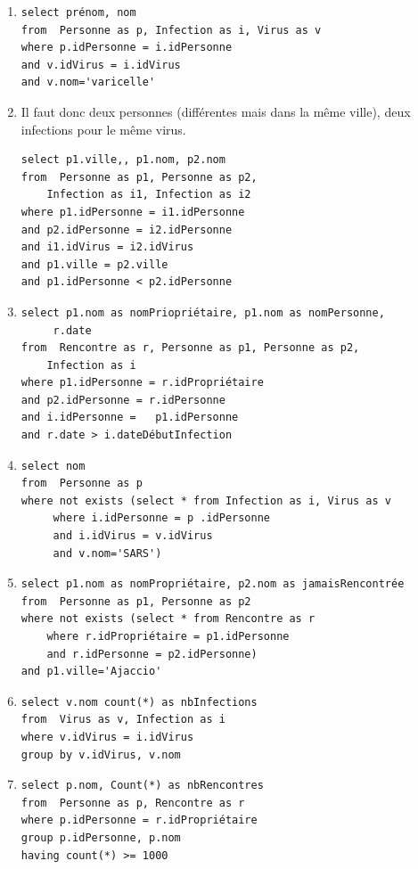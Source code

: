 \begin{solution}


\begin{enumerate}
  \item 
\begin{verbatim}
select prénom, nom
from  Personne as p, Infection as i, Virus as v
where p.idPersonne = i.idPersonne
and v.idVirus = i.idVirus
and v.nom='varicelle'
\end{verbatim}

 \item Il faut donc deux personnes (différentes mais
    dans la même ville),  deux infections pour le même virus.
\begin{verbatim}
select p1.ville,, p1.nom, p2.nom 
from  Personne as p1, Personne as p2, 
    Infection as i1, Infection as i2
where p1.idPersonne = i1.idPersonne
and p2.idPersonne = i2.idPersonne
and i1.idVirus = i2.idVirus
and p1.ville = p2.ville 
and p1.idPersonne < p2.idPersonne
\end{verbatim}

\item 
\begin{verbatim}
select p1.nom as nomPriopriétaire, p1.nom as nomPersonne,
     r.date
from  Rencontre as r, Personne as p1, Personne as p2, 
    Infection as i
where p1.idPersonne = r.idPropriétaire
and p2.idPersonne = r.idPersonne
and i.idPersonne =   p1.idPersonne
and r.date > i.dateDébutInfection
\end{verbatim}


\item 
\begin{verbatim}
select nom
from  Personne as p
where not exists (select * from Infection as i, Virus as v
     where i.idPersonne = p .idPersonne
     and i.idVirus = v.idVirus
     and v.nom='SARS')
\end{verbatim}


\item 
\begin{verbatim}
select p1.nom as nomPropriétaire, p2.nom as jamaisRencontrée
from  Personne as p1, Personne as p2
where not exists (select * from Rencontre as r
    where r.idPropriétaire = p1.idPersonne
    and r.idPersonne = p2.idPersonne)
and p1.ville='Ajaccio'
\end{verbatim}

\item 
\begin{verbatim}
select v.nom count(*) as nbInfections
from  Virus as v, Infection as i
where v.idVirus = i.idVirus
group by v.idVirus, v.nom
\end{verbatim}


\item 
\begin{verbatim}
select p.nom, Count(*) as nbRencontres 
from  Personne as p, Rencontre as r
where p.idPersonne = r.idPropriétaire
group p.idPersonne, p.nom
having count(*) >= 1000
\end{verbatim}
\end{enumerate}
\end{solution}


